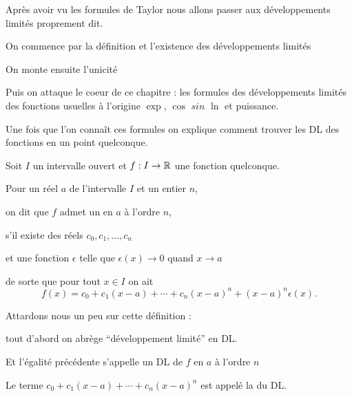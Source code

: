 







\debuttexte

\diapo

\change

Après avoir vu les formules de Taylor nous allons passer aux développements limités proprement
dit. 

\change
On commence par la définition et l'existence des développements limités

\change

On monte ensuite l'unicité

\change 

Puis on attaque le coeur de ce chapitre : les formules des développements limités
des fonctions usuelles à l'origine $\exp$, $\cos$ $sin$ $\ln$ et puissance.

\change

Une fois que l'on connaît ces formules on explique comment trouver
les DL des fonctions en un point quelconque.



\diapo

Soit $I$ un intervalle ouvert et $f : I \to \mathbb{R}$ une fonction quelconque.

Pour un réel $a$ de l'intervalle $I$ et un entier $n$, 

on dit que $f$ admet un  en $a$  à l'ordre $n$, 

s'il existe des réels $c_0, c_1,\ldots,c_n$

et une fonction $\epsilon$ telle que $\epsilon(x)\to0$ quand $x\to a$


de sorte que pour tout $x\in I$ 
on ait 
$$f(x)=c_0+c_1 (x-a)+\cdots+c_n(x-a)^n+(x-a)^n\epsilon(x).$$

Attardons nous un peu sur cette définition :

tout d'abord on abrège ``développement limité'' en DL.

Et l'égalité précédente s'appelle un DL de $f$ en $a$ à l'ordre $n$

\change

 Le terme $c_0+c_1(x-a)+\cdots+c_n(x-a)^n$ est appelé la  du DL.

